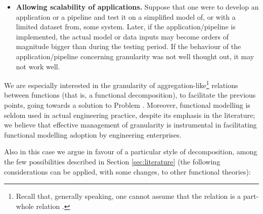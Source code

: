 \documentclass[
]{ceurart}
\begin{document}
\begin{itemize}
    \item \textbf{Allowing scalability of applications.} 
    Suppose that one were to develop an application or a pipeline and test it on a simplified model of, or with a limited dataset from, some system. Later, if the application/pipeline is implemented, the actual model or data inputs may become orders of magnitude bigger than during the testing period. If the behaviour of the application/pipeline concerning granularity was not well thought out, it may not work well.%
\end{itemize}

We are especially interested in the granularity of aggregation-like\footnote{Recall that, generally speaking, one cannot assume that the relation is a part-whole relation \cite{vermaasFormalImpossibilityAnalysing2013}.} relations between functions (that is, a functional decomposition), to facilitate the previous points, going towards a solution to Problem . Moreover, functional modelling is seldom used in actual engineering practice, despite its emphasis in the literature; we believe that effective management of granularity is instrumental in facilitating functional modelling adoption by engineering enterprises.

Also in this case we argue in favour of a particular style of decomposition, among the few possibilities described in Section \ref{sec:literature} (the following considerations can be applied, with some changes, to other functional theories):
\end{document}
